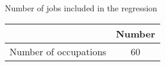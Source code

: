 \begin{center}
\begin{threeparttable}[!h]
\caption{Number of jobs included in the regression}
\label{tab:nJobReg}
\begin{tabular}{lc}
\toprule
\toprule
\textbf{}&\multicolumn{1}{c}{\textbf{Number}} \\
\midrule
Number of occupations & 60 \\
\bottomrule
\bottomrule
\end{tabular}
\end{threeparttable}
\end{center}
